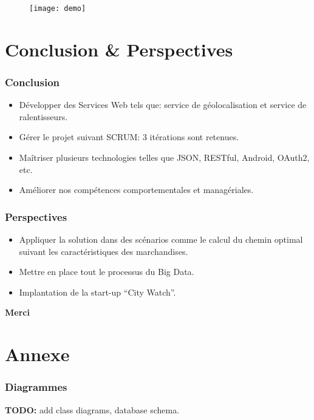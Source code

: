 \documentclass{beamer}
\begin{document}
\begin{frame}
    \begin{center}
    \begin{figure}
        \texttt{[image: demo]}
    \end{figure}
    \end{center}
\end{frame}

\section{Conclusion \& Perspectives}

\begin{frame}
    \frametitle{Conclusion}
    \begin{itemize}
        \item Développer des Services Web tels que: service de géolocalisation et service de ralentisseurs.
        \item Gérer le projet suivant SCRUM: 3 itérations sont retenues.
        \item Maîtriser plusieurs technologies telles que JSON, RESTful, Android, OAuth2, etc.
        \item Améliorer nos compétences comportementales et managériales.
    \end{itemize}
\end{frame}

\begin{frame}
    \frametitle{Perspectives}
    \begin{itemize}
        \item Appliquer la solution dans des scénarios comme le calcul du chemin optimal suivant les caractéristiques des marchandises.
        \item Mettre en place tout le processus du Big Data.
        \item Implantation de la start-up ``City Watch''.
    \end{itemize}
\end{frame}

\begin{frame}
    \begin{center}
        \bfseries \Huge
        Merci
    \end{center}
\end{frame}

\section*{Annexe}
\begin{frame}
\frametitle{Diagrammes}
\textbf{TODO:} add class diagrams, database schema.
\end{frame}
\end{document}
